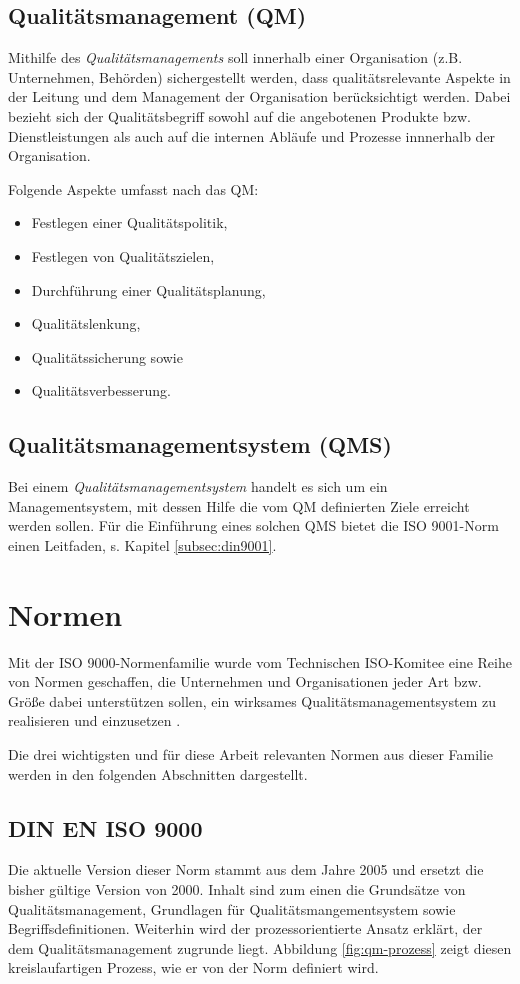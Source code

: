 \subsection{Qualitätsmanagement (QM)}
Mithilfe des \emph{Qualitätsmanagements} soll innerhalb einer Organisation 
(z.B. Unternehmen, Behörden) sichergestellt werden, dass qualitätsrelevante 
Aspekte in der Leitung und dem Management der Organisation berücksichtigt 
werden. Dabei bezieht sich der Qualitätsbegriff sowohl auf die angebotenen 
Produkte bzw. Dienstleistungen als auch auf die internen Abläufe und Prozesse 
innnerhalb der Organisation.

Folgende Aspekte umfasst nach \citep[S.~21]{din9000} das QM:

\begin{itemize}
  \item Festlegen einer Qualitätspolitik,
  \item Festlegen von Qualitätszielen,
  \item Durchführung einer Qualitätsplanung,
  \item Qualitätslenkung,
  \item Qualitätssicherung sowie
  \item Qualitätsverbesserung.
\end{itemize}

\subsection{Qualitätsmanagementsystem (QMS)}
Bei einem \emph{Qualitätsmanagementsystem} handelt es sich um ein
Managementsystem, mit dessen Hilfe die vom QM definierten Ziele erreicht werden
sollen. Für die Einführung eines solchen QMS bietet die ISO 9001-Norm einen
Leitfaden, s. Kapitel \ref{subsec:din9001}.

\section{Normen}
Mit der ISO 9000-Normenfamilie wurde vom Technischen ISO-Komitee eine Reihe von 
Normen geschaffen, die Unternehmen und Organisationen jeder Art bzw. Größe 
dabei unterstützen sollen, ein wirksames Qualitätsmanagementsystem zu 
realisieren und einzusetzen \citep[S.~4]{din9000}. 

Die drei wichtigsten und für diese Arbeit relevanten Normen aus dieser Familie 
werden in den folgenden Abschnitten dargestellt.

\subsection{DIN EN ISO 9000}
Die aktuelle Version dieser Norm stammt aus dem Jahre 2005 und ersetzt die
bisher gültige Version von 2000. Inhalt sind zum einen die Grundsätze von
Qualitätsmanagement, Grundlagen für Qualitätsmangementsystem sowie
Begriffsdefinitionen. Weiterhin wird der prozessorientierte Ansatz erklärt, der
dem Qualitätsmanagement zugrunde liegt. Abbildung \ref{fig:qm-prozess}
zeigt diesen kreislaufartigen Prozess, wie er von der Norm definiert wird.

